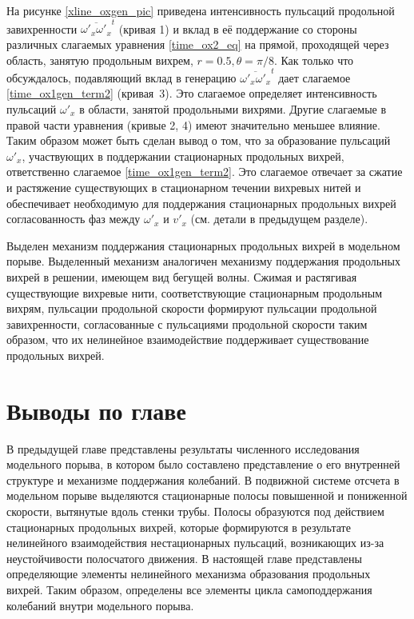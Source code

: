На рисунке \ref{xline_oxgen_pic} приведена интенсивность пульсаций продольной завихренности $\overline{\omega'_x \omega'_x}^t$ (кривая 1) и вклад в её поддержание со стороны различных слагаемых уравнения \eqref{time_ox2_eq} на прямой, проходящей через область, занятую продольным вихрем, $r = 0.5, \theta = \pi/8$. Как только что обсуждалось, подавляющий вклад в генерацию $\overline{\omega'_x \omega'_x}^t$ дает слагаемое \eqref{time_ox1gen_term2} (кривая~3). Это слагаемое определяет интенсивность пульсаций $\omega'_x$ в области, занятой продольными вихрями. Другие слагаемые в правой части уравнения (кривые 2, 4) имеют значительно меньшее влияние. Таким образом может быть сделан вывод о том, что за образование пульсаций $\omega'_x$, участвующих в поддержании стационарных продольных вихрей, ответственно слагаемое \eqref{time_ox1gen_term2}. Это слагаемое отвечает за сжатие и растяжение существующих в стационарном течении вихревых нитей и обеспечивает необходимую для поддержания стационарных продольных вихрей согласованность фаз между $\omega'_x$ и $v'_x$ (см. детали в предыдущем разделе). 

Выделен механизм поддержания стационарных продольных вихрей в модельном порыве. Выделенный механизм аналогичен механизму поддержания продольных вихрей в решении, имеющем вид бегущей волны. Сжимая и растягивая существующие вихревые нити, соответствующие стационарным продольным вихрям, пульсации продольной скорости формируют пульсации продольной завихренности, согласованные с пульсациями продольной скорости таким образом, что их нелинейное взаимодействие поддерживает существование продольных вихрей. 


\section{Выводы по главе}

В предыдущей главе представлены результаты численного исследования модельного порыва, в котором было составлено представление о его внутренней структуре и механизме поддержания колебаний. В подвижной системе отсчета в модельном порыве выделяются стационарные полосы повышенной и пониженной скорости, вытянутые вдоль стенки трубы. Полосы образуются под действием стационарных продольных вихрей, которые формируются в результате нелинейного взаимодействия нестационарных пульсаций, возникающих из-за неустойчивости полосчатого движения. В настоящей главе представлены определяющие элементы нелинейного механизма образования продольных вихрей. Таким образом, определены все элементы цикла самоподдержания колебаний внутри модельного порыва. 

